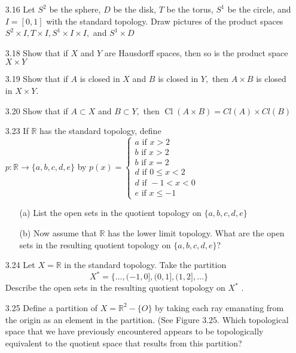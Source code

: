 \documentclass[12pt]{article}
\newcommand{\R}{\mathds{R}}
\begin{document}
\begin{enumerate}
	\item[3.16] Let $S ^ { 2 }$ be the sphere, $D$ be the disk, $T$ be the torus, $S ^ { 1 }$ be the circle, and $I = [ 0,1 ]$ with the standard topology. Draw pictures of the product spaces
	$S ^ { 2 } \times I , T \times I , S ^ { 1 } \times I \times I ,$ and $S ^ { 1 } \times D$

	\item[3.18] Show that if $X$ and $Y$ are Hausdorff spaces, then so is the product space $X \times Y$

	\item[3.19] Show that if $A$ is closed in $X$ and $B$ is closed in $Y ,$ then $A \times B$ is closed in $X \times Y .$

	\item[3.20] Show that if $A \subset X$ and $B \subset Y ,$ then $\operatorname { Cl } ( A \times B ) = C l ( A ) \times C l ( B )$

	\item[3.23] If $ \R $ has the standard topology, define \\
	$p : \mathbb { R } \rightarrow \{ a , b , c , d , e \}$ by $p ( x ) = \left\{ \begin{array} { l } { a \text { if } x > 2 } \\ { b \text { if } x > 2 } \\ { b \text { if } x = 2 } \\ { d \text { if } 0 \leq x < 2 } \\ { d \text { if } - 1 < x < 0 } \\ { e \text { if } x \leq - 1 } \end{array} \right.$
	\begin{enumerate}
		\item[(a)] List the open sets in the quotient topology on $\{ a , b , c , d , e \}$
		
		\item[(b)] Now assume that $\mathbb { R }$ has the lower limit topology. What are the open sets in the resulting quotient topology on $\{ a , b , c , d , e \} ?$
		
	\end{enumerate}

	\item[3.24] Let $X = \mathbb { R }$ in the standard topology. Take the partition
		\[X ^ { * } = \{ \ldots , ( - 1,0 ] , ( 0,1 ] , ( 1,2 ] , \ldots \}\]
	Describe the open sets in the resulting quotient topology on $X ^ { * }$ .

	\item[3.25] Define a partition of $X = \mathbb { R } ^ { 2 } - \{ O \}$ by taking each ray emanating from the origin as an element in the partition. (See Figure $3.25 .$ Which topological space that we have previously encountered appears to be topologically equivalent to the quotient space that results from this partition?


\end{enumerate}
\end{document}
